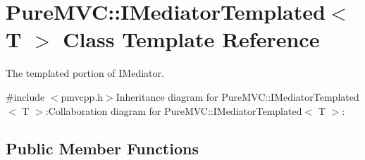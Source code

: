 \hypertarget{class_pure_m_v_c_1_1_i_mediator_templated}{
\section{PureMVC::IMediatorTemplated$<$ T $>$ Class Template Reference}
\label{class_pure_m_v_c_1_1_i_mediator_templated}
}


The templated portion of IMediator.  


{\ttfamily \#include $<$pmvcpp.h$>$}Inheritance diagram for PureMVC::IMediatorTemplated$<$ T $>$:Collaboration diagram for PureMVC::IMediatorTemplated$<$ T $>$:\subsection*{Public Member Functions}

